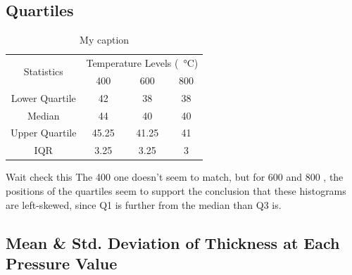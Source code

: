 \documentclass[letterpaper]{article}
\begin{document}
\subsection{Quartiles}

\begin{table}[H]
 \centering
 \begin{tabular}{c|c|c|c|}
  \multirow{2}{*}{Statistics} & \multicolumn{3}{c|}{Temperature Levels (\SI{}{\celsius})}               \\ \cline{2-4}
                              & 400                                                       & 600   & 800 \\ \hline
  Lower Quartile              & 42                                                        & 38    & 38  \\ \hline
  Median                      & 44                                                        & 40    & 40  \\ \hline
  Upper Quartile              & 45.25                                                     & 41.25 & 41  \\ \hline
  IQR                         & 3.25                                                      & 3.25  & 3   \\ \hline
 \end{tabular}
 \caption{My caption}
 \label{tempquart}
\end{table}

Wait check this
The 400  one doesn’t seem to match, but for 600  and 800 , the positions of the quartiles seem to support the conclusion that these histograms are left-skewed, since Q1 is further from the median than Q3 is.
\subsection{Mean \& Std. Deviation of Thickness at Each Pressure Value}
\end{document}
